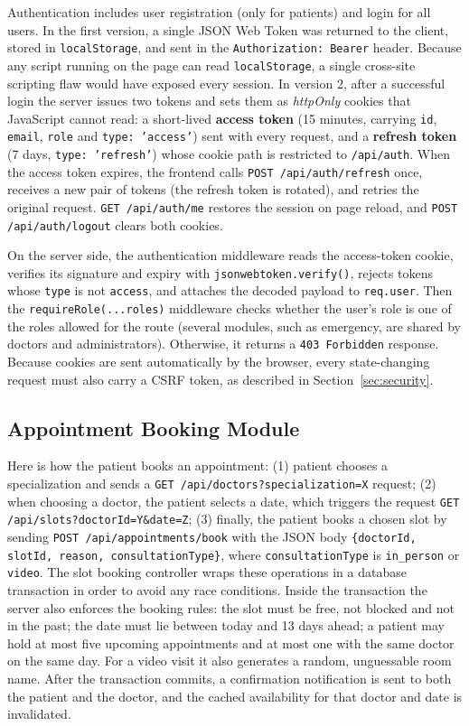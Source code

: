 Authentication includes user registration (only for patients) and login for all users. In the first version, a single JSON Web Token was returned to the client, stored in \texttt{localStorage}, and sent in the \texttt{Authorization: Bearer} header. Because any script running on the page can read \texttt{localStorage}, a single cross-site scripting flaw would have exposed every session. In version 2, after a successful login the server issues two tokens and sets them as \emph{httpOnly} cookies that JavaScript cannot read: a short-lived \textbf{access token} (15 minutes, carrying \texttt{id}, \texttt{email}, \texttt{role} and \texttt{type: 'access'}) sent with every request, and a \textbf{refresh token} (7 days, \texttt{type: 'refresh'}) whose cookie path is restricted to \texttt{/api/auth}. When the access token expires, the frontend calls \texttt{POST /api/auth/refresh} once, receives a new pair of tokens (the refresh token is rotated), and retries the original request. \texttt{GET /api/auth/me} restores the session on page reload, and \texttt{POST /api/auth/logout} clears both cookies.

On the server side, the authentication middleware reads the access-token cookie, verifies its signature and expiry with \texttt{jsonwebtoken.verify()}, rejects tokens whose \texttt{type} is not \texttt{access}, and attaches the decoded payload to \texttt{req.user}. Then the \texttt{requireRole(...roles)} middleware checks whether the user's role is one of the roles allowed for the route (several modules, such as emergency, are shared by doctors and administrators). Otherwise, it returns a \texttt{403 Forbidden} response. Because cookies are sent automatically by the browser, every state-changing request must also carry a CSRF token, as described in Section~\ref{sec:security}.

\subsection{Appointment Booking Module}

Here is how the patient books an appointment: (1) patient chooses a specialization and sends a \texttt{GET /api/doctors?specialization=X} request; (2) when choosing a doctor, the patient selects a date, which triggers the request \texttt{GET /api/slots?doctorId=Y\&date=Z}; (3) finally, the patient books a chosen slot by sending \texttt{POST /api/appointments/book} with the JSON body \texttt{\{doctorId, slotId, reason, consultationType\}}, where \texttt{consultationType} is \texttt{in\_person} or \texttt{video}. The slot booking controller wraps these operations in a database transaction in order to avoid any race conditions. Inside the transaction the server also enforces the booking rules: the slot must be free, not blocked and not in the past; the date must lie between today and 13 days ahead; a patient may hold at most five upcoming appointments and at most one with the same doctor on the same day. For a video visit it also generates a random, unguessable room name. After the transaction commits, a confirmation notification is sent to both the patient and the doctor, and the cached availability for that doctor and date is invalidated.

